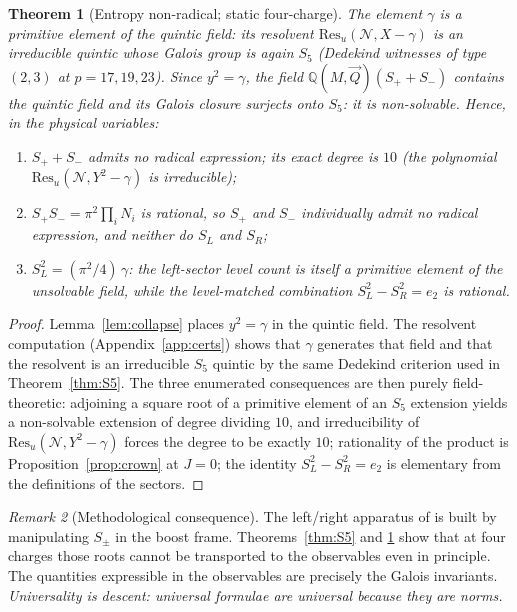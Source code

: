 \documentclass[11pt,a4paper]{article}
\newtheorem{theorem}{Theorem}[section]
\theoremstyle{definition}
\theoremstyle{remark}
\newtheorem{remark}[theorem]{Remark}
\newcommand{\Q}{\mathbb{Q}}
\newcommand{\Res}{\mathrm{Res}}
\begin{document}
\begin{theorem}[Entropy non-radical; static four-charge]
\label{thm:entropy}
The element \(\gamma\) is a primitive element of the quintic field: its resolvent
\(\Res_u(\mathcal N,X-\gamma)\) is an irreducible quintic whose Galois group is
again \(S_5\) (Dedekind witnesses of type \((2,3)\) at \(p=17,19,23\)). Since
\(y^2=\gamma\), the field \(\Q(M,\vec Q)(S_++S_-)\) contains the quintic field and
its Galois closure surjects onto \(S_5\): it is non-solvable. Hence, in the
physical variables:
\begin{enumerate}
\item \(S_++S_-\) admits no radical expression; its exact degree is \(10\)
(the polynomial \(\Res_u(\mathcal N,Y^2-\gamma)\) is irreducible);
\item \(S_+S_-=\pi^2\prod_iN_i\) is rational, so \(S_+\) and \(S_-\)
individually admit no radical expression, and neither do \(S_L\) and
\(S_R\);
\item \(S_L^2=(\pi^2/4)\,\gamma\): the left-sector level count is itself a
primitive element of the unsolvable field, while the level-matched
combination \(S_L^2-S_R^2=e_2\) is rational.
\end{enumerate}
\end{theorem}

\begin{proof}
Lemma~\ref{lem:collapse} places \(y^2=\gamma\) in the quintic field. The resolvent
computation (Appendix~\ref{app:certs}) shows that \(\gamma\) generates that
field and that the resolvent is an irreducible \(S_5\) quintic by the same
Dedekind criterion used in Theorem~\ref{thm:S5}. The three enumerated
consequences are then purely field-theoretic: adjoining a square root of a
primitive element of an \(S_5\) extension yields a non-solvable extension of
degree dividing \(10\), and irreducibility of \(\Res_u(\mathcal N,Y^2-\gamma)\)
forces the degree to be exactly \(10\); rationality of the product is
Proposition~\ref{prop:crown} at \(J=0\); the identity
\(S_L^2-S_R^2=e_2\) is elementary from the definitions of the sectors.
\end{proof}

\begin{remark}[Methodological consequence]
\label{rem:descent}
The left/right apparatus of \cite{CL1,CL2,CGLP2018} is built by manipulating
\(S_\pm\) in the boost frame. Theorems~\ref{thm:S5} and \ref{thm:entropy} show
that at four charges those roots cannot be transported to the observables even
in principle. The quantities expressible in the observables are precisely the
Galois invariants. \emph{Universality is descent: universal formulae are
universal because they are norms.}
\end{remark}
\end{document}
